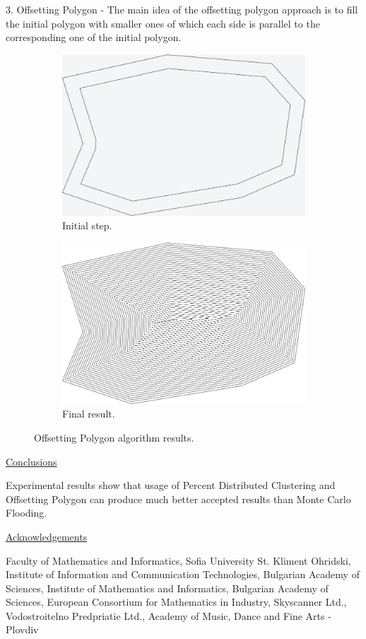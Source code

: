 \documentclass{article}
\begin{document}
3. Offsetting Polygon - The main idea of the offsetting polygon approach is to fill the initial polygon with smaller ones of which each side is parallel to the corresponding one of the initial polygon.
\begin{figure}[h!] 
\centering
\begin{subfigure}{.5\textwidth}
  \centering
  \includegraphics[width=.5\linewidth]{pic12.png}
  \caption{Initial step.}
  \label{fig:sub11}
\end{subfigure}%
\begin{subfigure}{.5\textwidth}
  \centering
  \includegraphics[width=.5\linewidth]{pic13.png}
  \caption{Final result.}
  \label{fig:sub12}
\end{subfigure}
\caption{Offsetting Polygon algorithm results.}
\label{fig:seven}
\end{figure}
\vspace*{3mm}

\underline{Conclusions}
\vspace*{3mm}

Experimental results show that usage of Percent Distributed Clustering and Offsetting Polygon can produce much better accepted results than Monte Carlo Flooding.
\vspace*{5mm}

\underline{Acknowledgements}
\vspace*{3mm}

Faculty of Mathematics and Informatics, Sofia University St. Kliment Ohridski, Institute of Information and Communication Technologies, Bulgarian Academy of Sciences, Institute of Mathematics and Informatics, Bulgarian Academy of Sciences, European Consortium for Mathematics in Industry, Skyscanner Ltd., Vodostroitelno Predpriatie Ltd., Academy of Music, Dance and Fine Arts - Plovdiv

%
\end{document}
